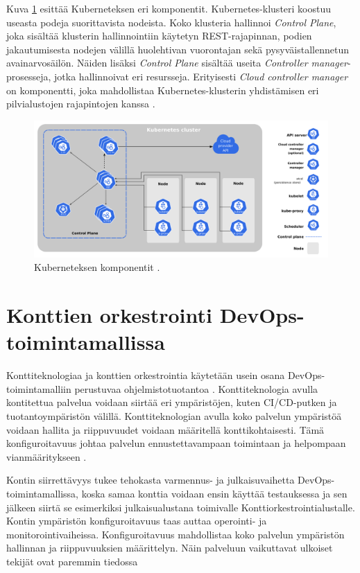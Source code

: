 Kuva \ref{fig:kubernetes} esittää Kuberneteksen eri komponentit. Kubernetes-klusteri koostuu useasta podeja suorittavista nodeista.
Koko klusteria hallinnoi \textit{Control Plane}, joka sisältää klusterin hallinnointiin käytetyn REST-rajapinnan, podien jakautumisesta nodejen välillä huolehtivan vuorontajan sekä pysyväistallennetun avainarvosäilön.
Näiden lisäksi \textit{Control Plane} sisältää useita \textit{Controller manager}-prosesseja, jotka hallinnoivat eri resursseja.
Erityisesti \textit{Cloud controller manager} on komponentti, joka mahdollistaa Kubernetes-klusterin yhdistämisen eri pilvialustojen rajapintojen kanssa \cite{components23}.

\begin{figure}[ht]
\begin{center}
\includegraphics[width=1\textwidth]{figures/kubernetes_components.png}
\caption{Kuberneteksen komponentit \cite{components23}\label{fig:kubernetes}.}
\end{center}
\end{figure}

\section{Konttien orkestrointi DevOps-toimintamallissa\label{orchestration:devops}}

Konttiteknologiaa ja konttien orkestrointia käytetään usein osana DevOps-toimintamalliin perustuvaa ohjelmistotuotantoa \cite{Kang16, Narasimhulu23}.
Konttiteknologia avulla kontitettua palvelua voidaan siirtää eri ympäristöjen, kuten CI/CD-putken ja tuotantoympäristön välillä.
Konttiteknologian avulla koko palvelun ympäristöä voidaan hallita ja riippuvuudet voidaan määritellä konttikohtaisesti.
Tämä konfiguroitavuus johtaa palvelun ennustettavampaan toimintaan ja helpompaan vianmääritykseen \cite{Narasimhulu23}.

Kontin siirrettävyys tukee tehokasta varmennus- ja julkaisuvaihetta DevOps-toimintamallissa, koska samaa konttia voidaan ensin käyttää testauksessa ja sen jälkeen siirtä se esimerkiksi julkaisualustana toimivalle Konttiorkestrointialustalle.
Kontin ympäristön konfiguroitavuus taas auttaa operointi- ja monitorointivaiheissa.
Konfiguroitavuus mahdollistaa koko palvelun ympäristön hallinnan ja riippuvuuksien määrittelyn.
Näin palveluun vaikuttavat ulkoiset tekijät ovat paremmin tiedossa

